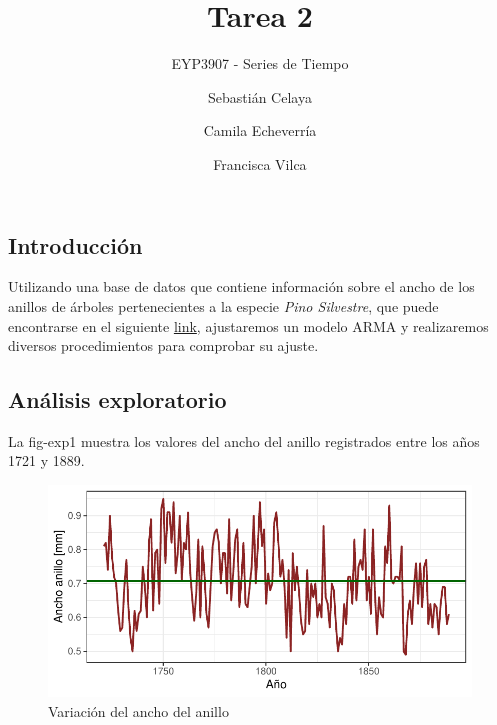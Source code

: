 \documentclass[
  letterpaper,
  DIV=11,
  numbers=noendperiod,
  twocolumn]{scrartcl}
\title{Tarea 2}
\subtitle{EYP3907 - Series de Tiempo}
\author{Sebastián Celaya \and Camila Echeverría \and Francisca Vilca}
\date{}
\begin{document}
\maketitle
\ifdefined\Shaded\renewenvironment{Shaded}{\begin{tcolorbox}[enhanced, breakable, borderline west={3pt}{0pt}{shadecolor}, interior hidden, frame hidden, boxrule=0pt, sharp corners]}{\end{tcolorbox}}\fi

\hypertarget{introducciuxf3n}{%
\subsection{Introducción}\label{introducciuxf3n}}

Utilizando una base de datos que contiene información sobre el ancho de
los anillos de árboles pertenecientes a la especie \emph{Pino
Silvestre}, que puede encontrarse en el siguiente
\href{https://www.ncei.noaa.gov/pub/data/paleo/treering/measurements/europe/norw001x-rwl-noaa.txt}{link},
ajustaremos un modelo ARMA y realizaremos diversos procedimientos para
comprobar su ajuste.

\hypertarget{anuxe1lisis-exploratorio}{%
\subsection{Análisis exploratorio}\label{anuxe1lisis-exploratorio}}

La fig-exp1 muestra los valores del ancho del anillo registrados entre
los años 1721 y 1889.

\begin{figure}[H]

{\centering \includegraphics{CopyOfpdf_tarea2_files/figure-pdf/fig-exp1-1.pdf}

}

\caption{\label{fig-exp1}Variación del ancho del anillo}

\end{figure}
\end{document}
